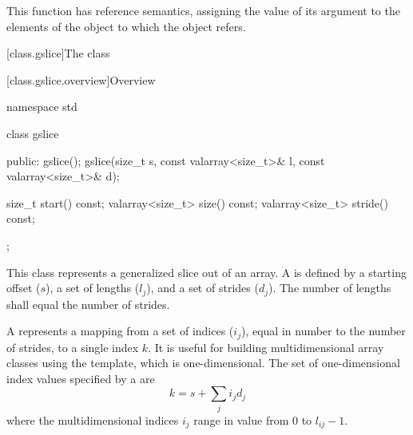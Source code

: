 \begin{itemdescr}
\pnum
This function has reference semantics, assigning the value of its argument
to the elements of the
object to which the
object refers.
\end{itemdescr}

[class.gslice]{The  class}

[class.gslice.overview]{Overview}

%
\begin{codeblock}
namespace std {
  class gslice {
  public:
    gslice();
    gslice(size_t s, const valarray<size_t>& l, const valarray<size_t>& d);

    size_t           start() const;
    valarray<size_t> size() const;
    valarray<size_t> stride() const;
  };
}
\end{codeblock}

\pnum
This class represents a generalized slice out of an array.
A
is defined by a starting offset ($s$),
a set of lengths ($l_j$),
and a set of strides ($d_j$).
The number of lengths shall equal the number of strides.

\pnum
A
represents a mapping from a set of indices ($i_j$),
equal in number to the number of strides, to a single index $k$.
It is useful for building multidimensional array classes using
the
template, which is one-dimensional.
The set of one-dimensional index values specified by a  are
\[ k = s + \sum_j i_j d_j \]
where the multidimensional indices $i_j$ range in value from
0 to $l_{ij} - 1$.

